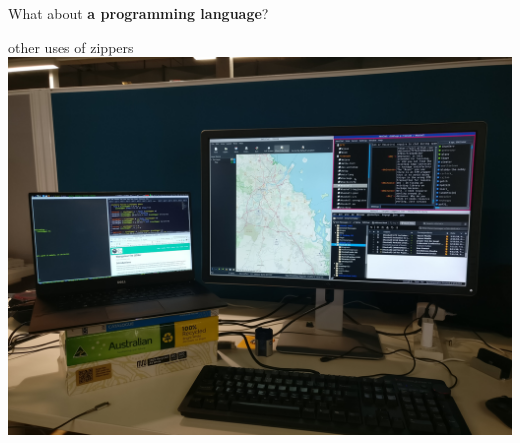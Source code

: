 \begin{frame}
\begin{center}
What about \textbf{a programming language}?
\end{center}
\end{frame}


\begin{frame}
\begin{block}{other uses of zippers}
\includegraphics[width=1.00\textheight]{image/xmonad.jpg}
\end{block}
\end{frame}
